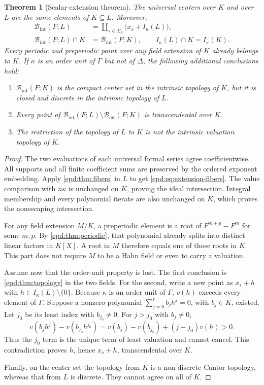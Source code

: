 \documentclass[11pt,a4paper]{article}
\numberwithin{equation}{section}
\newtheorem{theorem}{Theorem}[section]
\theoremstyle{plain}
\theoremstyle{definition}
\theoremstyle{remark}
\newcommand{\Ik}{I_\kappa}
\newcommand{\BI}{\mathcal B_{\mathrm{int}}}
\newcommand{\Sig}{\Sigma_d}
\begin{document}
\begin{theorem}[Scalar-extension theorem]\label{epd:thm:extension}
The universal centers over $K$ and over $L$ are the same elements of
$K\subseteq L$. Moreover,
\begin{align}
 \BI(F;L)&=\coprod_{s\in\Sig}\bigl(x_s+\Ik(L)\bigr),\label{epd:eq:extension-fibers}\\
 \BI(F;L)\cap K&=\BI(F;K),\qquad
 \Ik(L)\cap K=\Ik(K).\label{epd:eq:intersection-extension}
\end{align}
Every periodic and preperiodic point over \emph{any field extension}
of $K$ already belongs to $K$. If $\kappa$ is an order unit of $\Gamma$ but
not of $\Delta$, the following additional conclusions hold:
\begin{enumerate}[label=\textup{(\roman*)},leftmargin=2em]
\item $\BI(F;K)$ is the compact center set in the intrinsic topology of
$K$, but it is closed and discrete in the intrinsic topology of $L$.
\item Every point of $\BI(F;L)\setminus\BI(F;K)$ is transcendental over
$K$.
\item The restriction of the topology of $L$ to $K$ is not the intrinsic
valuation topology of $K$.
\end{enumerate}
\end{theorem}
\begin{proof}
The two evaluations of each universal formal series agree
coefficientwise. All supports and all finite coefficient sums are
preserved by the ordered exponent embedding. Apply
\cref{epd:thm:fibers} in $L$ to get \eqref{epd:eq:extension-fibers}.
The value comparison with $n\kappa$ is unchanged on $K$, proving the
ideal intersection. Integral membership and every polynomial iterate
are also unchanged on $K$, which proves the nonescaping intersection.

For any field extension $M/K$, a preperiodic element is a root of
$F^{m+p}-F^m$ for some $m,p$. By \cref{epd:thm:periodic}, that polynomial
already splits into distinct linear factors in $K[X]$. A root in $M$
therefore equals one of those roots in $K$. This part does not require
$M$ to be a Hahn field or even to carry a valuation.

Assume now that the order-unit property is lost. The first conclusion is
\cref{epd:thm:topology} in the two fields. For the second, write a new point
as $x_s+h$ with $h\in\Ik(L)\setminus\{0\}$. Because $\kappa$ is
an order unit of $\Gamma$, $v(h)$ exceeds every element of $\Gamma$.
Suppose a nonzero polynomial $\sum_{j=0}^r b_jh^j=0$, with $b_j\in K$,
existed. Let $j_0$ be its least index with $b_{j_0}\ne0$. For $j>j_0$
with $b_j\ne0$,
\[
 v(b_jh^j)-v(b_{j_0}h^{j_0})
 =v(b_j)-v(b_{j_0})+(j-j_0)v(h)>0.
\]
Thus the $j_0$ term is the unique term of least valuation and cannot
cancel. This contradiction proves $h$, hence $x_s+h$, transcendental
over $K$.

Finally, on the center set the topology from $K$ is a non-discrete
Cantor topology, whereas that from $L$ is discrete. They cannot agree
on all of $K$.
\end{proof}
\end{document}
